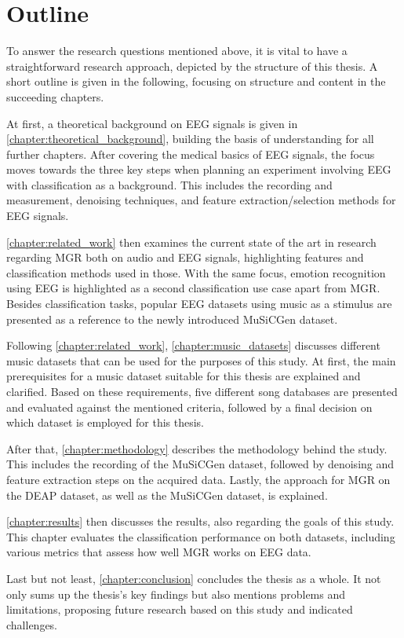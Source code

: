   \section{Outline}
    To answer the research questions mentioned above, it is vital to have a straightforward research approach, depicted by the structure of this thesis. A short outline is given in the following, focusing on structure and content in the succeeding chapters. \par
    At first, a theoretical background on \ac{EEG} signals is given in \autoref{chapter:theoretical_background}, building the basis of understanding for all further chapters. After covering the medical basics of \ac{EEG} signals, the focus moves towards the three key steps when planning an experiment involving \ac{EEG} with classification as a background. This includes the recording and measurement, denoising techniques, and feature extraction/selection methods for \ac{EEG} signals. \par
    \autoref{chapter:related_work} then examines the current state of the art in research regarding \ac{MGR} both on audio and \ac{EEG} signals, highlighting features and classification methods used in those. With the same focus, emotion recognition using \ac{EEG} is highlighted as a second classification use case apart from \ac{MGR}. Besides classification tasks, popular \ac{EEG} datasets using music as a stimulus are presented as a reference to the newly introduced \ac{MuSiCGen} dataset. \par
    Following \autoref{chapter:related_work}, \autoref{chapter:music_datasets} discusses different music datasets that can be used for the purposes of this study. At first, the main prerequisites for a music dataset suitable for this thesis are explained and clarified. Based on these requirements, five different song databases are presented and evaluated against the mentioned criteria, followed by a final decision on which dataset is employed for this thesis. \par
    After that, \autoref{chapter:methodology} describes the methodology behind the study. This includes the recording of the \ac{MuSiCGen} dataset, followed by denoising and feature extraction steps on the acquired data. Lastly, the approach for \ac{MGR} on the \ac{DEAP} dataset, as well as the \ac{MuSiCGen} dataset, is explained. \par 
    \autoref{chapter:results} then discusses the results, also regarding the goals of this study. This chapter evaluates the classification performance on both datasets, including various metrics that assess how well \ac{MGR} works on \ac{EEG} data. \par
    Last but not least, \autoref{chapter:conclusion} concludes the thesis as a whole. It not only sums up the thesis's key findings but also mentions problems and limitations, proposing future research based on this study and indicated challenges.

